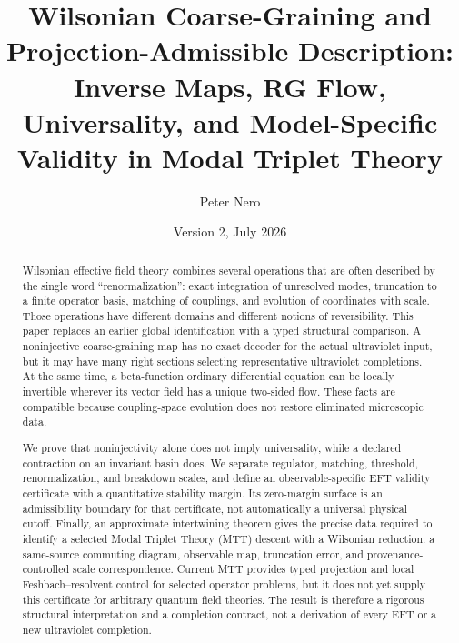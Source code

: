 \documentclass[11pt]{article}
\title{\textbf{Wilsonian Coarse-Graining and Projection-Admissible Description:}\\
\large Inverse Maps, RG Flow, Universality, and Model-Specific Validity
in Modal Triplet Theory}
\author{Peter Nero}
\date{Version 2, July 2026}
\theoremstyle{definition}
\theoremstyle{remark}
\begin{document}
\maketitle

\begin{abstract}
Wilsonian effective field theory combines several operations that are often
described by the single word ``renormalization'': exact integration of
unresolved modes, truncation to a finite operator basis, matching of
couplings, and evolution of coordinates with scale.  Those operations have
different domains and different notions of reversibility.  This paper
replaces an earlier global identification with a typed structural
comparison.  A noninjective coarse-graining map has no exact decoder for the
actual ultraviolet input, but it may have many right sections selecting
representative ultraviolet completions.  At the same time, a beta-function
ordinary differential equation can be locally invertible wherever its vector
field has a unique two-sided flow.  These facts are compatible because
coupling-space evolution does not restore eliminated microscopic data.

We prove that noninjectivity alone does not imply universality, while a
declared contraction on an invariant basin does.  We separate regulator,
matching, threshold, renormalization, and breakdown scales, and define an
observable-specific EFT validity certificate with a quantitative stability
margin.  Its zero-margin surface is an admissibility boundary for that
certificate, not automatically a universal physical cutoff.  Finally, an
approximate intertwining theorem gives the precise data required to identify
a selected Modal Triplet Theory (MTT) descent with a Wilsonian reduction: a
same-source commuting diagram, observable map, truncation error, and
provenance-controlled scale correspondence.  Current MTT provides typed
projection and local Feshbach--resolvent control for selected operator
problems, but it does not yet supply this certificate for arbitrary quantum
field theories.  The result is therefore a rigorous structural
interpretation and a completion contract, not a derivation of every EFT or a
new ultraviolet completion.
\end{abstract}
\end{document}
